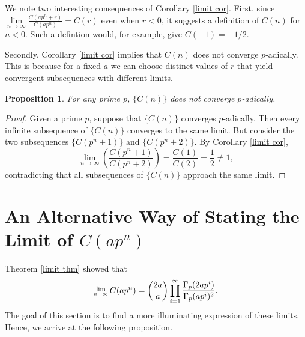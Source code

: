 \documentclass[12pt, letter]{article}    %
\theoremstyle{plain}
\newtheorem{proposition}[theorem]{Proposition}
\theoremstyle{definition}
\newtheorem{definition}[theorem]{Definition}
\numberwithin{equation}{section}
\newcommand{\Lim}[1]{\raisebox{0.5ex}{\scalebox{0.8}{$\displaystyle \lim_{#1}\;$}}}
\newcommand{\integers}{\mathbb{Z}}
\newcommand{\thref}[1]{Theorem \ref{#1}}
\newcommand{\coref}[1]{Corollary \ref{#1}}
\begin{document}
We note two interesting consequences of \coref{limit cor}. First, since $\lim\limits_{n\rightarrow \infty}\frac{C(ap^n+r)}{C(ap^n)}=C(r)$ even when $r<0$, it suggests a definition of $C(n)$ for $n<0$. Such a defintion would, for example, give $C(-1)=-1/2$. 

Secondly, \coref{limit cor} implies that $C(n)$ does not converge $p$-adically. This is because for a fixed $a$ we can choose distinct values of $r$ that yield convergent subsequences with different limits.

\begin{proposition}
For any prime $p$, $\{C(n)\}$ does not converge $p$-adically.

\end{proposition}
\begin{proof}
Given a prime $p$, suppose that $\{C(n)\}$ converges $p$-adically. Then every infinite subsequence of $\{C(n)\}$ converges to the same limit. But consider the two subsequences $\{C(p^n+1)\}$ and $\{C(p^n+2)\}$. By \coref{limit cor}, 
$$\lim\limits_{n\rightarrow \infty}\left(\frac{C(p^n+1)}{C(p^n+2)}\right)=\frac{C(1)}{C(2)}=\frac{1}{2}\neq 1,$$ contradicting that all subsequences of $\{C(n)\}$ approach the same limit.
\end{proof}


\section{An Alternative Way of Stating the Limit of $C(ap^n)$}




\thref{limit thm} showed that 
\begin{equation} \label{limit}
\Lim{n\rightarrow \infty} C(ap^n)=
\binom{2a}{a}\prod_{i=1}^{\infty}\frac{\Gamma_p(2ap^i)}{\Gamma_p(ap^i)^2}.
\end{equation}
The goal of this section is to find a more illuminating expression of these limits. Hence, we arrive at the following proposition.
\end{document}
